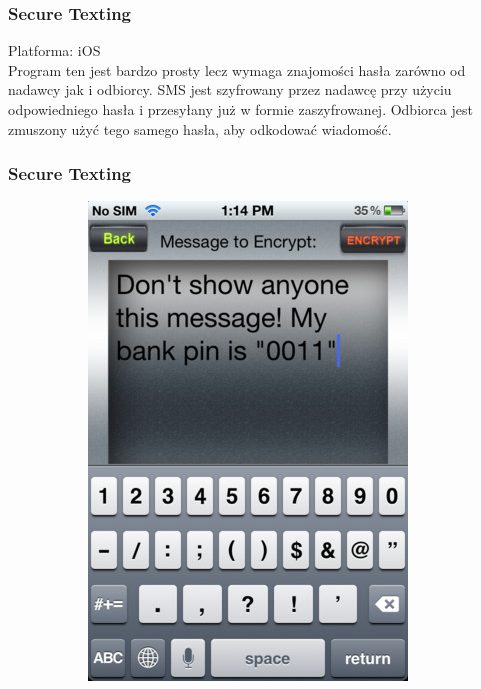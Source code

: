 \documentclass[xcolor=table]{beamer}
\begin{document}
\begin{frame}
  \frametitle{Secure Texting}
	
	Platforma: iOS\\
	Program ten jest bardzo prosty lecz wymaga znajomości hasła zarówno 
	od nadawcy jak i odbiorcy. SMS jest szyfrowany przez nadawcę przy użyciu 
	odpowiedniego hasła i przesyłany już w formie zaszyfrowanej. 
	Odbiorca jest zmuszony użyć tego samego hasła, aby odkodować wiadomość.
\end{frame}
\begin{frame}
  \frametitle{Secure Texting}
    \begin{center}
        \begin{figure}
          \centering
            \begin{subfigure}[b]{0.4\textwidth}
               \centering
               \includegraphics[width=\textwidth]{secure_texting_1}

\end{subfigure}
\end{figure}
\end{center}
\end{frame}
\end{document}

